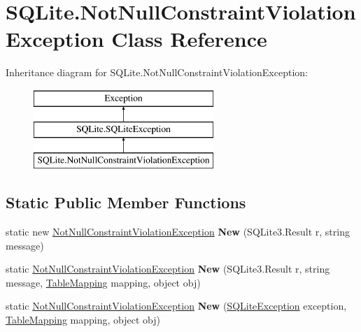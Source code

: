 \hypertarget{classSQLite_1_1NotNullConstraintViolationException}{}\section{S\+Q\+Lite.\+Not\+Null\+Constraint\+Violation\+Exception Class Reference}
\label{classSQLite_1_1NotNullConstraintViolationException}
Inheritance diagram for S\+Q\+Lite.\+Not\+Null\+Constraint\+Violation\+Exception\+:\begin{figure}[H]
\begin{center}
\leavevmode
\includegraphics[height=3.000000cm]{classSQLite_1_1NotNullConstraintViolationException}
\end{center}
\end{figure}
\subsection*{Static Public Member Functions}
\begin{DoxyCompactItemize}
\item 
\hypertarget{classSQLite_1_1NotNullConstraintViolationException_a7989030e3242311aaca6b3d184184396}{}static new \hyperlink{classSQLite_1_1NotNullConstraintViolationException}{Not\+Null\+Constraint\+Violation\+Exception} {\bfseries New} (S\+Q\+Lite3.\+Result r, string message)\label{classSQLite_1_1NotNullConstraintViolationException_a7989030e3242311aaca6b3d184184396}

\item 
\hypertarget{classSQLite_1_1NotNullConstraintViolationException_ac25b33dde04a9b12bd6984038e4b2972}{}static \hyperlink{classSQLite_1_1NotNullConstraintViolationException}{Not\+Null\+Constraint\+Violation\+Exception} {\bfseries New} (S\+Q\+Lite3.\+Result r, string message, \hyperlink{classSQLite_1_1TableMapping}{Table\+Mapping} mapping, object obj)\label{classSQLite_1_1NotNullConstraintViolationException_ac25b33dde04a9b12bd6984038e4b2972}

\item 
\hypertarget{classSQLite_1_1NotNullConstraintViolationException_a25c290bafcea136ebd06b2959bf20c3c}{}static \hyperlink{classSQLite_1_1NotNullConstraintViolationException}{Not\+Null\+Constraint\+Violation\+Exception} {\bfseries New} (\hyperlink{classSQLite_1_1SQLiteException}{S\+Q\+Lite\+Exception} exception, \hyperlink{classSQLite_1_1TableMapping}{Table\+Mapping} mapping, object obj)\label{classSQLite_1_1NotNullConstraintViolationException_a25c290bafcea136ebd06b2959bf20c3c}

\end{DoxyCompactItemize}
